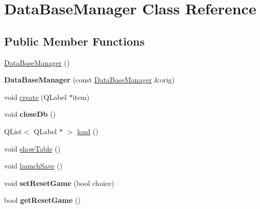 \hypertarget{class_data_base_manager}{\section{Data\-Base\-Manager Class Reference}
\label{class_data_base_manager}
}
\subsection*{Public Member Functions}
\begin{DoxyCompactItemize}
\item 
\hyperlink{class_data_base_manager_a876dd05c6424d0efb99d95a2c584a804}{Data\-Base\-Manager} ()
\item 
\hypertarget{class_data_base_manager_a3b91f96f1be6a637759ea10ccb20b116}{{\bfseries Data\-Base\-Manager} (const \hyperlink{class_data_base_manager}{Data\-Base\-Manager} \&orig)}\label{class_data_base_manager_a3b91f96f1be6a637759ea10ccb20b116}

\item 
void \hyperlink{class_data_base_manager_a77d78a7b7c5a5e4ffbdecd18431df5ca}{create} (Q\-Label $\ast$item)
\item 
\hypertarget{class_data_base_manager_a5991b838d7fb6e71f440ffd986366311}{void {\bfseries close\-Db} ()}\label{class_data_base_manager_a5991b838d7fb6e71f440ffd986366311}

\item 
Q\-List$<$ Q\-Label $\ast$ $>$ \hyperlink{class_data_base_manager_a6f3e5a052947cbf1a3a6211edd49b183}{load} ()
\item 
void \hyperlink{class_data_base_manager_ac7af4c3a862853b5ebd12c35338e4004}{show\-Table} ()
\item 
void \hyperlink{class_data_base_manager_adcd538709bbbb818c49ef27504e17f6c}{launch\-Save} ()
\item 
\hypertarget{class_data_base_manager_a6254877a64abea331bcdf567bade19cc}{void {\bfseries set\-Reset\-Game} (bool choice)}\label{class_data_base_manager_a6254877a64abea331bcdf567bade19cc}

\item 
\hypertarget{class_data_base_manager_a7536bf6bb93057f0f64902f981c36c66}{bool {\bfseries get\-Reset\-Game} ()}\label{class_data_base_manager_a7536bf6bb93057f0f64902f981c36c66}

\end{DoxyCompactItemize}


